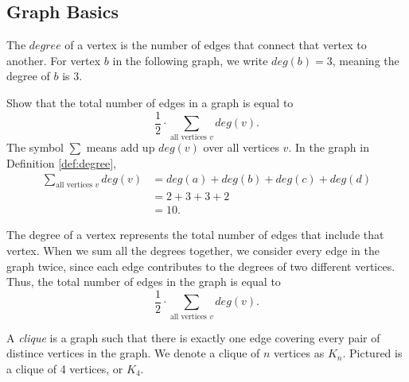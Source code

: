 \documentclass[11pt]{article}
\begin{document}
\subsection{Graph Basics}

\begin{definition}
\label{def:degree}
The $degree$ of a vertex is the number of edges that connect that vertex to another. For vertex $b$ in the following graph, we write $deg(b) = 3$,
meaning the degree of $b$ is 3.
\begin{center}
\end{center}
\end{definition}

\begin{problem} %
Show that the total number of edges in a graph is equal to
\[\frac{1}{2} \cdot \sum_{\text{all vertices $v$}} deg(v).\]
The symbol $\sum$ means add up $deg(v)$ over all vertices $v$. In the graph in Definition \ref{def:degree},
\begin{align*}
\sum_{\text{all vertices $v$}} deg(v) &= deg(a) + deg(b) + deg(c) + deg(d) \\
&= 2 + 3 + 3 + 2 \\
&= 10.
\end{align*}
\end{problem}

\begin{solution}
The degree of a vertex represents the total number of edges that include that vertex. When we sum all the degrees together,
we consider every edge in the graph twice, since each edge contributes to the degrees of two different vertices. Thus, the total number
of edges in the graph is equal to 
\[\frac{1}{2} \cdot \sum_{\text{all vertices $v$}} deg(v).\]
\end{solution}

\begin{definition}
\label{def:clique}
A \textit{clique} is a graph such that there is exactly one edge covering every pair of distince vertices in the graph.
We denote a clique of $n$ vertices as $K_n$.
Pictured is a clique of 4 vertices, or $K_4$.
\begin{center}
\end{center}
\end{definition}
\end{document}

